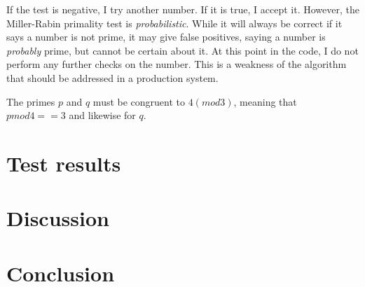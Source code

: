 \documentclass[a4paper,english,12pt]{article}
\begin{document}
If the test is negative, I try another number. If it is true, I accept
it. However, the Miller-Rabin primality test is \textit{probabilistic}. While
it will always be correct if it says a number is not prime, it may give false
positives, saying a number is \textit{probably} prime, but cannot be certain
about it. At this point in the code, I do not perform any further checks on the
number. This is a weakness of the algorithm that should be addressed in a
production system.

The primes $p$ and $q$ must be congruent to $4 (mod 3)$, meaning that $p mod 4
== 3$ and likewise for $q$.

\section{Test results}

\section{Discussion}

\section{Conclusion}



\end{document}
